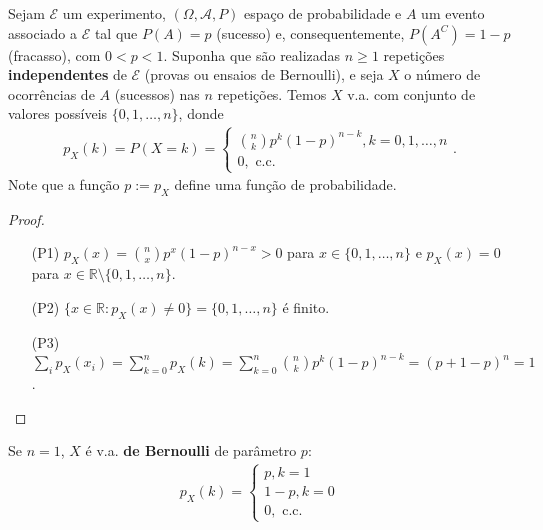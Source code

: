 \documentclass[../Notas.tex]{subfiles}
\begin{document}
\begin{example}
Sejam $\mathcal{E}$ um experimento, $(\Omega, \mathcal{A}, P)$ espaço de probabilidade e $A$ um evento associado a $\mathcal{E}$ tal que $P(A) = p$ (sucesso) e, consequentemente, $P(A^C) = 1 - p$ (fracasso), com $0 < p < 1$. Suponha que são realizadas $n\geq 1$ repetições \textbf{independentes} de $\mathcal{E}$ (provas ou ensaios de Bernoulli), e seja $X$ o número de ocorrências de $A$ (sucessos) nas $n$ repetições. Temos $X$ v.a. com conjunto de valores possíveis $\{0, 1, \dots, n\}$, donde
\begin{align*}
    p_X(k) = P(X=k) = \begin{cases}
    \binom{n}{k}p^k(1-p)^{n-k}, k = 0, 1, \dots, n \\
    0, \text{ c.c.}
    \end{cases}.
\end{align*}
Note que a função $p:= p_X$ define uma função de probabilidade.
\begin{proof}
\begin{itemize}
    \item[(P1)] $p_X(x) = \binom{n}{x}p^x(1-p)^{n-x} > 0$ para $x\in\{0, 1, \dots, n\}$ e $p_X(x) = 0$ para $x\in\mathbb{R}\setminus\{0, 1, \dots, n\}$.
    \item[(P2)] $\{ x\in\mathbb{R} : p_X(x)\neq 0 \} = \{ 0, 1, \dots, n \}$ é finito.
    \item[(P3)] $\displaystyle{ \sum_i p_X(x_i) = \sum_{k=0}^{n} p_X(k) = \sum_{k=0}^{n}\binom{n}{k}p^k(1-p)^{n-k} = (p + 1-p)^n = 1 }$.
\end{itemize}
\end{proof}
Se $n=1$, $X$ é v.a. \textbf{de Bernoulli} de parâmetro $p$:
\begin{align*}
    p_X(k) = \begin{cases}
    p, k = 1 \\
    1 - p, k = 0 \\
    0, \text{ c.c.}
    \end{cases}
\end{align*}
\end{example}
\end{document}
